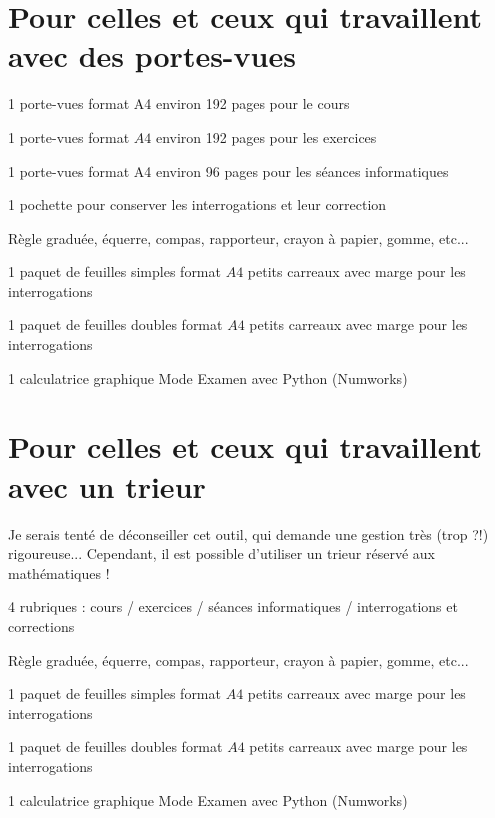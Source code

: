 \documentclass[11pt,a4paper]{article}  %
\begin{document}
\section*{Pour celles et ceux qui travaillent avec des portes-vues}

\begin{itemMet}
	\item 1 porte-vues format A4 environ 192 pages pour le cours
	\item 1 porte-vues format $A 4$ environ 192 pages pour les exercices
	\item 1 porte-vues format A4 environ 96 pages pour les séances informatiques
	\item 1 pochette pour conserver les interrogations et leur correction
	\item Règle graduée, équerre, compas, rapporteur, crayon à papier, gomme, etc...
	\item 1 paquet de feuilles simples format $A 4$ petits carreaux avec marge pour les interrogations 
	\item 1 paquet de feuilles doubles format $A 4$ petits carreaux avec marge pour les interrogations
	\item 1 calculatrice graphique Mode Examen avec Python (Numworks)
\end{itemMet}

\section*{Pour celles et ceux qui travaillent avec un trieur}

Je serais tenté de déconseiller cet outil, qui demande une gestion très (trop ?!) rigoureuse... Cependant, il est possible d'utiliser un trieur réservé aux mathématiques !
\begin{itemMet}
	\item 4 rubriques : cours / exercices / séances informatiques / interrogations et corrections
	\item Règle graduée, équerre, compas, rapporteur, crayon à papier, gomme, etc...
	\item 1 paquet de feuilles simples format $A 4$ petits carreaux avec marge pour les interrogations 
	\item 1 paquet de feuilles doubles format $A 4$ petits carreaux avec marge pour les interrogations
	\item 1 calculatrice graphique Mode Examen avec Python (Numworks)
\end{itemMet}
\end{document}

